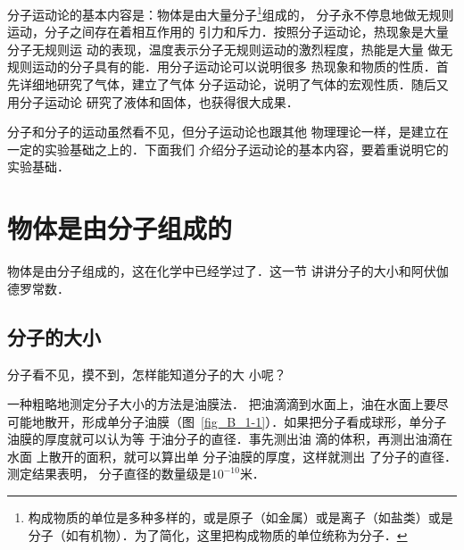 分子运动论的基本内容是：物体是由大量分子\footnote{构成物质的单位是多种多样的，或是原子（如金属）或是离子（如盐类）或是分子（如有机物）．为了简化，这里把构成物质的单位统称为分子．}组成的，
分子永不停息地做无规则运动，分子之间存在着相互作用的
引力和斥力．按照分子运动论，热现象是大量分子无规则运
动的表现，温度表示分子无规则运动的激烈程度，热能是大量
做无规则运动的分子具有的能．用分子运动论可以说明很多
热现象和物质的性质．首先详细地研究了气体，建立了气体
分子运动论，说明了气体的宏观性质．随后又用分子运动论
研究了液体和固体，也获得很大成果．

    分子和分子的运动虽然看不见，但分子运动论也跟其他
物理理论一样，是建立在一定的实验基础之上的．下面我们
介绍分子运动论的基本内容，要着重说明它的实验基础．

\section{物体是由分子组成的}
    物体是由分子组成的，这在化学中已经学过了．这一节
讲讲分子的大小和阿伏伽德罗常数．

\subsection{分子的大小}

    分子看不见，摸不到，怎样能知道分子的大
小呢？

    一种粗略地测定分子大小的方法是油膜法．
把油滴滴到水面上，油在水面上要尽可能地散开，形成单分子油膜（图~\ref{fig_B_1-1}）．如果把分子看成球形，单分子油膜的厚度就可以认为等
于油分子的直径．事先测出油
滴的体积，再测出油滴在水面
上散开的面积，就可以算出单
分子油膜的厚度，这样就测出
了分子的直径．测定结果表明，
分子直径的数量级是$10^{-10}$米．

